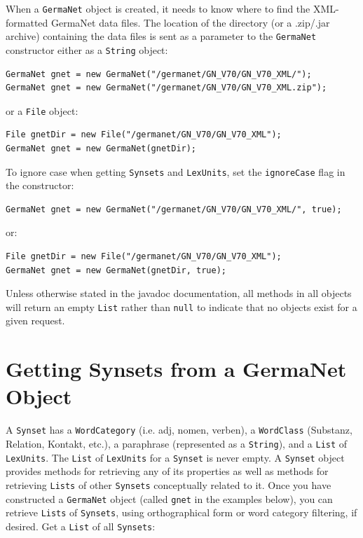 \documentclass[12pt,a4paper,english,utf8]{report}
\begin{document}
When a \texttt{GermaNet} object is created, it needs to know where to find the XML-formatted GermaNet data files. The location of the directory (or a .zip/.jar archive) containing the data files is sent as a parameter to the \texttt{GermaNet} constructor either as a \texttt{String} object:

\begin{lstlisting}
GermaNet gnet = new GermaNet("/germanet/GN_V70/GN_V70_XML/");
GermaNet gnet = new GermaNet("/germanet/GN_V70/GN_V70_XML.zip");
\end{lstlisting}

or a \texttt{File} object:

\begin{lstlisting}
File gnetDir = new File("/germanet/GN_V70/GN_V70_XML");
GermaNet gnet = new GermaNet(gnetDir);
\end{lstlisting}

To ignore case when getting \texttt{Synsets} and \texttt{LexUnits}, set the \texttt{ignoreCase} flag in the constructor:

\begin{lstlisting}
GermaNet gnet = new GermaNet("/germanet/GN_V70/GN_V70_XML/", true);
\end{lstlisting}

or:

\begin{lstlisting}
File gnetDir = new File("/germanet/GN_V70/GN_V70_XML");
GermaNet gnet = new GermaNet(gnetDir, true);
\end{lstlisting}

Unless otherwise stated in the javadoc documentation, all methods in all objects will return an empty \texttt{List} rather than \texttt{null} to indicate that no objects exist for a given request.



\section{Getting Synsets from a GermaNet Object}

A \texttt{Synset} has a \texttt{WordCategory} (i.e. adj, nomen, verben), a \texttt{WordClass} (Substanz, Relation, Kontakt, etc.), a paraphrase (represented as a \texttt{String}), and a \texttt{List} of \texttt{LexUnits}. The \texttt{List} of \texttt{LexUnits} for a \texttt{Synset} is never empty.
A \texttt{Synset} object provides methods for retrieving any of its properties as well as methods for retrieving \texttt{Lists} of other \texttt{Synsets} conceptually related to it. Once you have constructed a \texttt{GermaNet} object (called \texttt{gnet} in the examples below), you can retrieve \texttt{Lists} of \texttt{Synsets}, using orthographical form or word category filtering, if desired.
Get a \texttt{List} of all \texttt{Synsets}:
\end{document}

